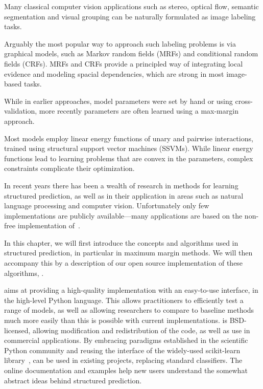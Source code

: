 Many classical computer vision applications such as stereo, optical flow, semantic
segmentation and visual grouping can be naturally formulated as image labeling tasks.

Arguably the most popular way to approach such labeling problems is via graphical
models, such as Markov random fields (MRFs) and conditional random fields (CRFs).
MRFs and CRFs provide a principled way of integrating local evidence and
modeling spacial dependencies, which are strong in most image-based tasks.

While in earlier approaches, model parameters were set by hand or using
cross-validation, more recently parameters are often learned using a max-margin
approach.

Most models employ linear energy functions of unary and pairwise interactions,
trained using structural support vector machines (SSVMs). While linear energy
functions lead to learning problems that are convex in the parameters, complex
constraints complicate their optimization. 

In recent years there has been a wealth of research in methods for learning structured prediction,
as well as in their application in areas such as natural language processing and computer vision.
Unfortunately only few implementations are publicly available---many applications are based on
the non-free implementation of~\citet{joachims2009cutting}.

In this chapter, we will first introduce the concepts and algorithms used in structured prediction,
in particular in maximum margin methods. We will then accompany this by a description of our
open source implementation of these algorithms, \pystruct.

\pystruct aims at providing a high-quality implementation with an easy-to-use
interface, in the high-level Python language.  This allows practitioners to
efficiently test a range of models, as well as allowing researchers to compare
to baseline methods much more easily than this is possible with current
implementations.  \pystruct is BSD-licensed, allowing modification and
redistribution of the code, as well as use in commercial applications.  By
embracing paradigms established in the scientific Python community and reusing
the interface of the widely-used {\sc scikit-learn}
library~\citep{pedregosa2011scikit}, \pystruct can be used in existing
projects, replacing standard classifiers.  The online documentation and
examples help new users understand the somewhat abstract ideas behind
structured prediction.

